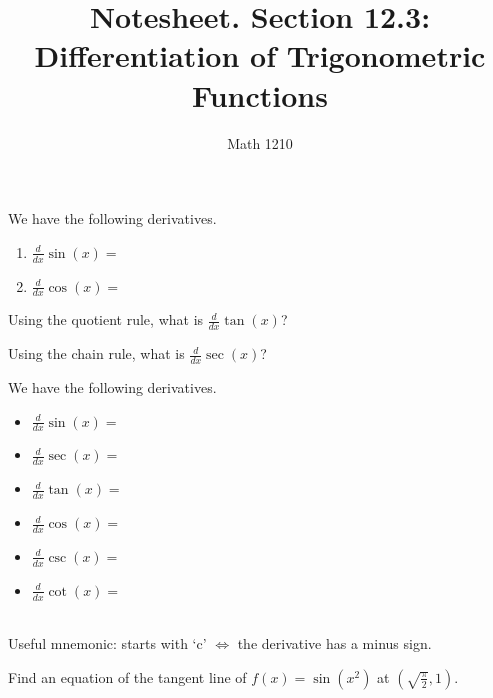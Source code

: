 \documentclass[12pt, a4paper]{article}
\author{Math 1210}
\title{Notesheet. Section 12.3: Differentiation of Trigonometric Functions}
\date{}
\begin{document}
\maketitle
\nameline
\begin{thrm}
  We have the following derivatives.
  \begin{enumerate}
  \item \(\frac{d}{dx} \sin(x) = \)
  \item \(\frac{d}{dx} \cos(x) = \)
  \end{enumerate}
\end{thrm}
\begin{ex}
  Using the quotient rule, what is \(\frac{d}{dx} \tan(x)\)?
\end{ex}
\begin{ex}
  Using the chain rule, what is \(\frac{d}{dx} \sec(x)\)? 
\end{ex}
\begin{thrm}
  We have the following derivatives.\\
  \begin{minipage}{0.5\linewidth}
    \begin{itemize}
    \item \(\frac{d}{dx} \sin(x) = \)
    \item \(\frac{d}{dx} \sec(x) = \)
    \item \(\frac{d}{dx} \tan(x) = \)
    \end{itemize}
  \end{minipage}
  \begin{minipage}{0.4\linewidth}
    \begin{itemize}
    \item \(\frac{d}{dx} \cos(x) = \)
    \item \(\frac{d}{dx} \csc(x) = \)
    \item \(\frac{d}{dx} \cot(x) = \)
    \end{itemize}
  \end{minipage}
  \ \\
  
  Useful mnemonic: starts with `c' \(\iff\) the derivative has a minus
  sign.
\end{thrm}
\begin{ex}
  Find an equation of the tangent line of \(f(x) = \sin(x^2)\) at
  \(\left( \sqrt{\frac{\pi}{2}}, 1 \right)\). 
\end{ex}
\end{document}
